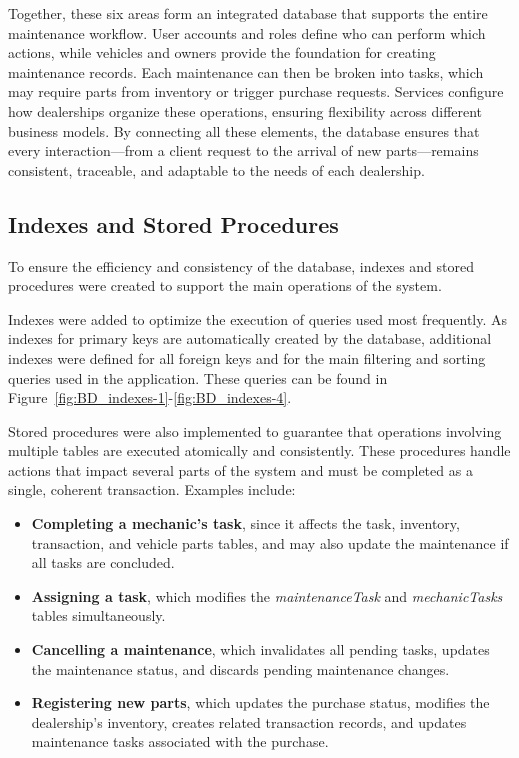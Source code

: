 Together, these six areas form an integrated database that supports the entire maintenance workflow. User accounts and roles define who can perform which actions, while vehicles and owners provide the foundation for creating maintenance records. Each maintenance can then be broken into tasks, which may require parts from inventory or trigger purchase requests. Services configure how dealerships organize these operations, ensuring flexibility across different business models. By connecting all these elements, the database ensures that every interaction—from a client request to the arrival of new parts—remains consistent, traceable, and adaptable to the needs of each dealership.

\subsection{Indexes and Stored Procedures}

To ensure the efficiency and consistency of the database, indexes and stored procedures were created to support the main operations of the system.

Indexes were added to optimize the execution of queries used most frequently. As indexes for primary keys are automatically created by the database, additional indexes were defined for all foreign keys and for the main filtering and sorting queries used in the application. These queries can be found in Figure~\ref{fig:BD_indexes-1}-\ref{fig:BD_indexes-4}.  

Stored procedures were also implemented to guarantee that operations involving multiple tables are executed atomically and consistently. These procedures handle actions that impact several parts of the system and must be completed as a single, coherent transaction. Examples include:

\begin{itemize}
  \item \textbf{Completing a mechanic's task}, since it affects the task, inventory, transaction, and vehicle parts tables, and may also update the maintenance if all tasks are concluded.
  \item \textbf{Assigning a task}, which modifies the \textit{maintenanceTask} and \textit{mechanicTasks} tables simultaneously.
  \item \textbf{Cancelling a maintenance}, which invalidates all pending tasks, updates the maintenance status, and discards pending maintenance changes.
  \item \textbf{Registering new parts}, which updates the purchase status, modifies the dealership's inventory, creates related transaction records, and updates maintenance tasks associated with the purchase.
\end{itemize}

